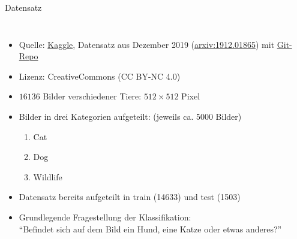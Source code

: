 \documentclass[aspectratio=1610, 9pt]{beamer}
\begin{document}
\begin{frame}{Datensatz}
  \begin{columns}


    \begin{itemize}
    \item Quelle: \href{https://www.kaggle.com/andrewmvd/animal-faces?}{Kaggle}, Datensatz aus Dezember 2019 (\href{https://arxiv.org/abs/1912.01865}{arxiv:1912.01865}) mit \href{https://github.com/clovaai/stargan-v2}{Git-Repo}
    \item Lizenz: CreativeCommons (CC BY-NC 4.0)
    \item $16136$ Bilder verschiedener Tiere: $512\times 512$ Pixel
    \item Bilder in drei Kategorien aufgeteilt: (jeweils ca. 5000 Bilder)
      \begin{enumerate}
      \item Cat
      \item Dog
      \item Wildlife
      \end{enumerate}
    \item Datensatz bereits aufgeteilt in train (14633) und test (1503)
    \item Grundlegende Fragestellung der Klassifikation:\\
    \rightarrow{} ``Befindet sich auf dem Bild ein Hund, eine Katze oder etwas anderes?''
    \end{itemize}


\end{columns}
\end{frame}
\end{document}
